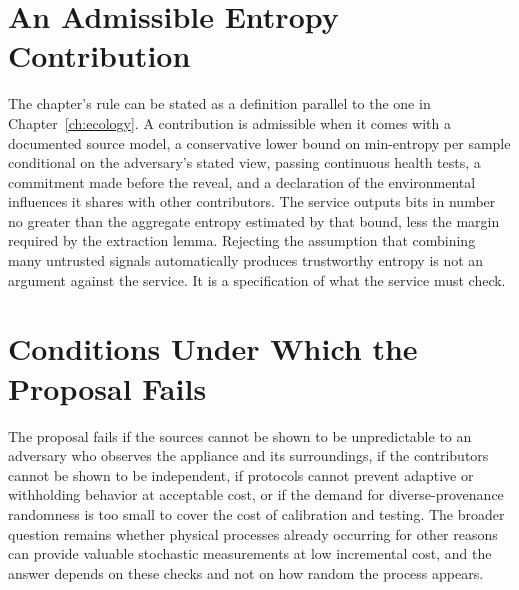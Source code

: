 \section{An Admissible Entropy Contribution}

The chapter's rule can be stated as a definition parallel to the one in Chapter~\ref{ch:ecology}. A contribution is admissible when it comes with a documented source model, a conservative lower bound on min-entropy per sample conditional on the adversary's stated view, passing continuous health tests, a commitment made before the reveal, and a declaration of the environmental influences it shares with other contributors. The service outputs bits in number no greater than the aggregate entropy estimated by that bound, less the margin required by the extraction lemma. Rejecting the assumption that combining many untrusted signals automatically produces trustworthy entropy is not an argument against the service. It is a specification of what the service must check.

\section{Conditions Under Which the Proposal Fails}

The proposal fails if the sources cannot be shown to be unpredictable to an adversary who observes the appliance and its surroundings, if the contributors cannot be shown to be independent, if protocols cannot prevent adaptive or withholding behavior at acceptable cost, or if the demand for diverse-provenance randomness is too small to cover the cost of calibration and testing. The broader question remains whether physical processes already occurring for other reasons can provide valuable stochastic measurements at low incremental cost, and the answer depends on these checks and not on how random the process appears.
